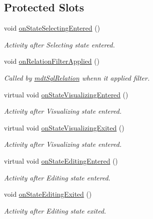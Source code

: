 \subsection*{Protected Slots}
\begin{DoxyCompactItemize}
\item 
void \hyperlink{classmdt_abstract_sql_table_controller_a70bcc01ddd639fc05663b356df3e137e}{on\-State\-Selecting\-Entered} ()
\begin{DoxyCompactList}\small\item\em Activity after Selecting state entered. \end{DoxyCompactList}\item 
void \hyperlink{classmdt_abstract_sql_table_controller_a45c1bd8be73435191d385ba3b6282937}{on\-Relation\-Filter\-Applied} ()
\begin{DoxyCompactList}\small\item\em Called by \hyperlink{classmdt_sql_relation}{mdt\-Sql\-Relation} whenn it applied filter. \end{DoxyCompactList}\item 
virtual void \hyperlink{classmdt_abstract_sql_table_controller_a120e99bd86672ff9d019a359b45d4e71}{on\-State\-Visualizing\-Entered} ()
\begin{DoxyCompactList}\small\item\em Activity after Visualizing state entered. \end{DoxyCompactList}\item 
virtual void \hyperlink{classmdt_abstract_sql_table_controller_a72e9097d1bed821edc46ba42fa486cb2}{on\-State\-Visualizing\-Exited} ()
\begin{DoxyCompactList}\small\item\em Activity after Visualizing state entered. \end{DoxyCompactList}\item 
virtual void \hyperlink{classmdt_abstract_sql_table_controller_a6a9611880e1fe8475d18fa628cda1bc0}{on\-State\-Editing\-Entered} ()
\begin{DoxyCompactList}\small\item\em Activity after Editing state entered. \end{DoxyCompactList}\item 
void \hyperlink{classmdt_abstract_sql_table_controller_abff869c48f9c3b3f30ace2eaef1f2691}{on\-State\-Editing\-Exited} ()
\begin{DoxyCompactList}\small\item\em Activity after Editing state exited. \end{DoxyCompactList}\item 

\end{DoxyCompactItemize}
